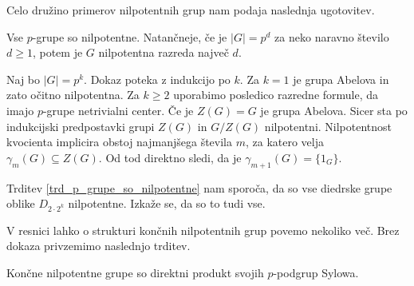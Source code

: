 Celo družino primerov nilpotentnih grup nam podaja naslednja ugotovitev.
\begin{trditev}
\label{trd_p_grupe_so_nilpotentne}
    Vse $p$-grupe so nilpotentne. Natančneje, če je $\lvert G \rvert  = p^{d}$ za neko naravno število $d \ge 1$, potem je $G$ nilpotentna razreda največ $d$. 
\end{trditev}
\begin{dokaz}
    Naj bo $\lvert G \rvert = p^k$. Dokaz poteka z indukcijo po $k$. Za $k = 1$ je grupa Abelova in zato očitno nilpotentna. Za $k \ge 2$ uporabimo posledico razredne formule, da imajo $p$-grupe netrivialni center.
    Če je $Z(G) = G$ je grupa Abelova. Sicer sta po indukcijski predpostavki grupi $Z(G)$ in $G / Z(G)$ nilpotentni. Nilpotentnost kvocienta implicira obstoj najmanjšega števila $m$, za katero velja $\gamma_m(G) \subseteq Z(G)$.
    Od tod direktno sledi, da je $\gamma_{m + 1}(G) = \{ 1_G \}$.
\end{dokaz}

\begin{primer}
Trditev \ref{trd_p_grupe_so_nilpotentne} nam sporoča, da so vse diedrske grupe oblike $D_{2 \cdot 2^{k}}$ nilpotentne. Izkaže se, da so to tudi vse. %
\end{primer}

V resnici lahko o strukturi končnih nilpotentnih grup povemo nekoliko več. Brez dokaza privzemimo naslednjo trditev. %
\begin{trditev}\label{trd_nilpotentne_so_produkti_sylowih}
    Končne nilpotentne grupe so direktni produkt svojih $p$-podgrup Sylowa.
\end{trditev}

